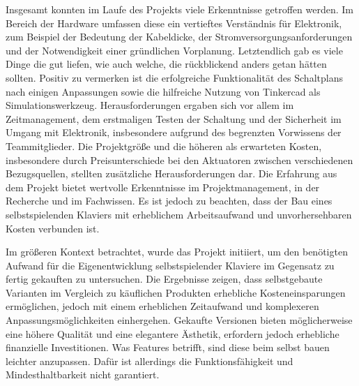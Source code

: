 Insgesamt konnten im Laufe des Projekts viele Erkenntnisse getroffen werden.
Im Bereich der Hardware umfassen diese ein vertieftes Verständnis für Elektronik, zum Beispiel der Bedeutung der Kabeldicke, der Stromversorgungsanforderungen und der Notwendigkeit einer gründlichen Vorplanung. %
Letztendlich gab es viele Dinge die gut liefen, wie auch welche, die rückblickend anders getan hätten sollten.
Positiv zu vermerken ist die erfolgreiche Funktionalität des Schaltplans nach einigen Anpassungen sowie die hilfreiche Nutzung von Tinkercad als Simulationswerkzeug. %
Herausforderungen ergaben sich vor allem im Zeitmanagement, dem erstmaligen Testen der Schaltung und der Sicherheit im Umgang mit Elektronik, insbesondere aufgrund des begrenzten Vorwissens der Teammitglieder. %
Die Projektgröße und die höheren als erwarteten Kosten, insbesondere durch Preisunterschiede bei den Aktuatoren zwischen verschiedenen Bezugsquellen, stellten zusätzliche Herausforderungen dar. %
Die Erfahrung aus dem Projekt bietet wertvolle Erkenntnisse im Projektmanagement, in der Recherche und im Fachwissen.
Es ist jedoch zu beachten, dass der Bau eines selbstspielenden Klaviers mit erheblichem Arbeitsaufwand und unvorhersehbaren Kosten verbunden ist.

Im größeren Kontext betrachtet, wurde das Projekt initiiert, um den benötigten Aufwand für die Eigenentwicklung selbstspielender Klaviere im Gegensatz zu fertig gekauften zu untersuchen.
Die Ergebnisse zeigen, dass selbstgebaute Varianten im Vergleich zu käuflichen Produkten erhebliche Kosteneinsparungen ermöglichen, jedoch mit einem erheblichen Zeitaufwand und komplexeren Anpassungsmöglichkeiten einhergehen.
Gekaufte Versionen bieten möglicherweise eine höhere Qualität und eine elegantere Ästhetik, erfordern jedoch erhebliche finanzielle Investitionen.
Was Features betrifft, sind diese beim selbst bauen leichter anzupassen.
Dafür ist allerdings die Funktionsfähigkeit und  Mindesthaltbarkeit nicht garantiert.

